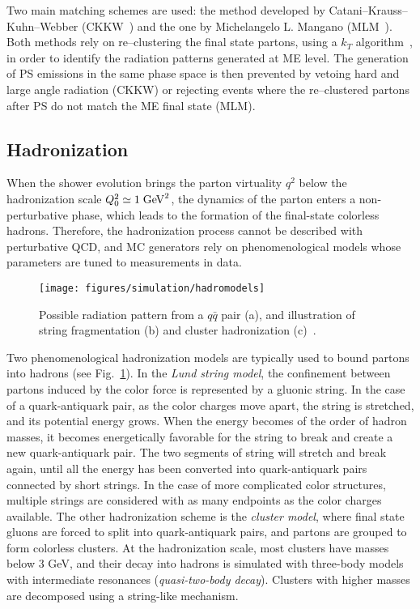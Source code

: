 Two main matching schemes are used: the method developed by
Catani--Krauss--Kuhn--Webber (CKKW~\cite{Catani:2001cc}) and the one by
Michelangelo L. Mangano (MLM~\cite{Mangano:2006rw}).
Both methods rely on re--clustering the final state partons, using a
$k_T$ algorithm~\cite{Catani:1991hj}, in order to identify the
radiation patterns generated at ME level. The generation of PS
emissions in the same phase space is then prevented by vetoing hard
and large angle radiation (CKKW) or rejecting events where the
re--clustered partons after PS do not match the ME final state (MLM).

\subsection{Hadronization}
\label{sec:hadronization}

When the shower evolution brings the parton virtuality $q^2$ below the
hadronization scale $Q_0^2\simeq1\; \mathrm{GeV}^2$, the dynamics of the parton
enters a non-perturbative phase, which leads to the formation of the
final-state colorless hadrons. Therefore, the hadronization process cannot
be described with perturbative QCD, and MC generators rely on
phenomenological models whose parameters are tuned to measurements in
data.

\begin{figure}[ht]
  \begin{center}
    \texttt{[image: figures/simulation/hadromodels]}
    \caption[Hadronization models]{
      Possible radiation pattern from a $q\bar{q}$ pair (a), and
      illustration of string fragmentation (b) and cluster
      hadronization (c)~\cite{mangano2005}.}
    \label{fig:hadronization}
  \end{center}
\end{figure}

Two phenomenological hadronization models are typically used to bound
partons into hadrons (see Fig.~\ref{fig:hadronization}).
In the {\it Lund string model}, the confinement between partons
induced by the color force is represented by a gluonic string. In the
case of a quark-antiquark pair, as the color charges move apart, the
string is stretched, and its potential energy grows. When the energy
becomes of the order of hadron masses, it becomes energetically
favorable for the string to break and create a new quark-antiquark
pair. The two segments of string will stretch and break again, until
all the energy has been converted into quark-antiquark pairs connected
by short strings. In the case of more complicated color structures,
multiple strings are considered with as many endpoints as the color
charges available.
The other hadronization scheme is the {\it cluster model}, where
final state gluons are forced to split into quark-antiquark pairs,
and partons are grouped to form colorless clusters.
At the hadronization scale, most clusters have masses below $3$ GeV, and
their decay into hadrons is simulated with three-body models with
intermediate resonances ({\it quasi-two-body decay}). 
Clusters with higher masses are decomposed using a string-like
mechanism.

